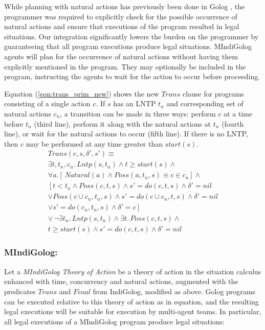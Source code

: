\documentclass{llncs}
\begin{document}
While planning with natural actions has previously been done in Golog
\cite{pirri00planning_nat_acts}, the programmer
was required to explicitly check for the possible occurrence of natural
actions and ensure that executions of the program resulted in legal
situations. Our integration significantly lowers the burden on the
programmer by guaranteeing that all program executions produce legal
situations.
MIndiGolog agents will plan for the occurrence of natural actions
without having them explicitly mentioned in the program.  They may
optionally be included in the program, instructing the agents to wait for
the action to occur before proceeding.

Equation (\ref{eqn:trans_prim_new}) shows the new $Trans$ clause for programs
consisting of a single action $c$.  If $s$ has an LNTP $t_n$ and corresponding
set of natural actions $c_n$, a transition can be made in three ways:
perform $c$ at a time before $t_n$ (third line), perform it along with
the natural actions at $t_n$ (fourth line), or wait for the natural
actions to occur (fifth line).  If there is no LNTP, then $c$ may be
performed at any time greater than $start(s)$.
\begin{multline}
\label{eqn:trans_prim_new}
Trans(c,s,\delta',s')\equiv \\
  \exists t,t_n,c_n.\,Lntp(s,t_n) \wedge t\geq start(s) \wedge\\
      \forall a.\left[\,Natural(a)\wedge Poss(a,t_n,s)\equiv c\in c_n\right]\wedge\\
      \left[ t<t_n\wedge Poss(c,t,s)\wedge s'=do(c,t,s)\wedge \delta'=nil\right.\\
            \vee Poss(c\cup c_n,t_n,s)\wedge s'=do(c\cup c_n,t,s)\wedge \delta'=nil\\
            \vee \left.s'=do(c_n,t_n,s)\wedge \delta'=c\right]\\
  \vee\,\neg\exists t_{n}.\,Lntp(s,t_{n})\wedge\exists t.\,Poss(c,t,s)\wedge\\
  t\geq start(s)\wedge s'=do(c,t,s)\wedge\delta'=nil
\end{multline}

\subsubsection{MIndiGolog:}
Let a \emph{MIndiGolog Theory of Action} be a theory
of action in the situation calculus enhanced with time, concurrency and
natural actions, augmented with the predicates $Trans$ and $Final$ from
IndiGolog, modified as above.
Golog programs can be executed relative to this
theory of action as in equation, and the resulting legal
executions will be suitable for execution by multi-agent teams.
In particular, all legal executions of a MIndiGolog
program produce legal situations:
\end{document}
